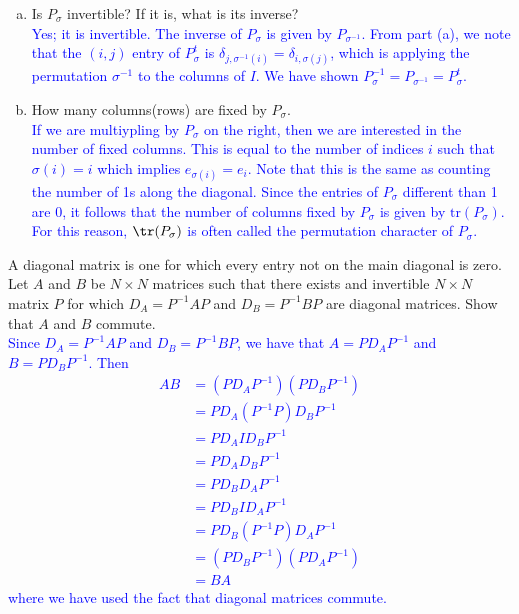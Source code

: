 \documentclass[a4paper,11pt]{article}
\newcommand{\BB}[1]{\textcolor{blue}{#1}}
\begin{document}
\begin{enumerate}[(a)]
\item Is $P_\sigma$ invertible? If it is, what is its inverse? \\

  \BB{Yes; it is invertible. The inverse of $P_\sigma$ is given by
    $P_{\sigma^{-1}}$. From part (a), we note that the $(i,j)$ entry of
    $P_{\sigma}^t$ is $\delta_{j,\sigma^{-1}(i)}=\delta_{i,\sigma(j)}$, which is
  applying the permutation $\sigma^{-1}$ to the columns of $I$. We have shown
  $P_\sigma^{-1}=P_{\sigma^{-1}}=P_\sigma^t$.\\}
  
\item How many columns(rows) are fixed by $P_\sigma$. \\

  \BB{If we are multiypling by $P_\sigma$ on the right, then we are interested
    in the number of fixed columns. This is equal to the number of indices $i$
    such that $\sigma(i)=i$ which implies $e_{\sigma(i)}=e_i$. Note that this is
  the same as counting the number of 1s along the diagonal. Since the entries of
$P_\sigma$ different than 1 are 0, it follows that the number of columns fixed
by $P_\sigma$ is given by $\text{tr}(P_\sigma)$. For this reason,
$\tr(P_\sigma)$ is often called the permutation character of $P_\sigma$.\\}

\end{enumerate}

 A diagonal matrix is one for which every entry
not on the main diagonal is zero. Let $A$ and $B$ be $N \times N$ matrices such
that there exists and invertible $N \times N$ matrix $P$ for which
$D_A=P^{-1}AP$ and $D_B=P^{-1}BP$ are diagonal matrices. Show that $A$ and $B$
commute. \\

\BB{Since $D_A=P^{-1}AP$ and $D_B=P^{-1}BP$, we have that $A=PD_AP^{-1}$ and
  $B=PD_BP^{-1}$. Then
  \begin{align*}
    AB &= (PD_AP^{-1})(PD_BP^{-1}) \\
       &= PD_A(P^{-1}P)D_BP^{-1} \\
       &= PD_AID_BP^{-1} \\
       &= PD_AD_BP^{-1} \\
       &= PD_BD_AP^{-1} \\
       &= PD_BID_AP^{-1} \\
       &= PD_B(P^{-1}P)D_AP^{-1} \\
       &= (PD_BP^{-1})(PD_AP^{-1}) \\
       &= BA
  \end{align*}
  where we have used the fact that diagonal matrices commute.
}
\end{document}
